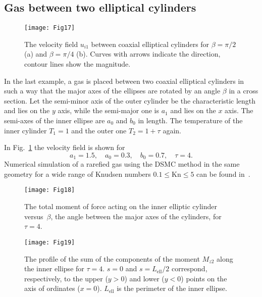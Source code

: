 \documentclass[smallextended]{svjour3} %
\newcommand{\Kn}{\mathrm{Kn}}
\begin{document}
\subsection{Gas between two elliptical cylinders}

\begin{figure}
    \centering
    \texttt{[image: Fig17]}
    \caption{The velocity field \(u_{i1}\) between coaxial elliptical cylinders
            for \(\beta = \pi/2\) (a) and \(\beta = \pi/4\) (b).
        Curves with arrows indicate the direction, contour lines show the magnitude.}
    \label{fig:elliptic}
\end{figure}

In the last example, a gas is placed between two coaxial elliptical cylinders
in such a way that the major axes of the ellipses are rotated by an angle \(\beta\) in a cross section.
Let the semi-minor axis of the outer cylinder be the characteristic length and lies on the \(y\) axis,
while the semi-major one is \(a_1\) and lies on the \(x\) axis.
The semi-axes of the inner ellipse are \(a_0\) and \(b_0\) in length.
The temperature of the inner cylinder \(T_1 = 1\) and the outer one \(T_2 = 1+\tau\) again.

In Fig.~\ref{fig:elliptic} the velocity field is shown for
\[ a_1 = 1.5, \quad a_0 = 0.3, \quad b_0 = 0.7, \quad \tau = 4. \]
Numerical simulation of a rarefied gas using the DSMC method in the same geometry
for a wide range of Knudsen numbers \(0.1\le\Kn\le5\) can be found in~\cite{SoneCoaxial}.

\begin{figure}[ht]
    \centering
    \begin{minipage}{.48\textwidth}
        \centering
        \texttt{[image: Fig18]}
        \caption{The total moment of force acting on the inner elliptic cylinder
                versus~\(\beta\), the angle between the major axes of the cylinders,
                for \(\tau=4\).}
        \label{fig:elliptic:beta}
    \end{minipage}
    \quad
    \begin{minipage}{.48\textwidth}
        \centering
        \texttt{[image: Fig19]}
        \caption{The profile of the sum of the components of the moment \(M_{z2}\)
                along the inner ellipse for \(\tau=4\).
                \(s=0\) and \(s=L_\mathrm{ell}/2\) correspond, respectively,
                to the upper (\(y>0\)) and lower (\(y<0\)) points on the axis of ordinates (\(x=0\)).
                \(L_\mathrm{ell}\) is the perimeter of the inner ellipse.}
        \label{fig:elliptic:profiles}
    \end{minipage}
\end{figure}
\end{document}
